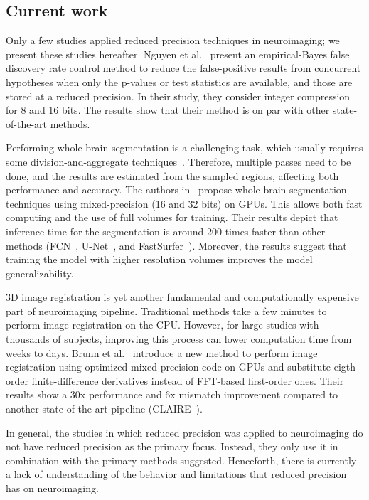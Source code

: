 \subsection{Current work}
Only a few studies applied reduced precision techniques in neuroimaging; we present these studies hereafter.
Nguyen et al.~\cite{Nguyen2018-lo} present an empirical-Bayes false discovery rate
control method to reduce the false-positive results from concurrent hypotheses when
only the p-values or test statistics are available, and those are stored at a reduced precision. 
In their study, they consider integer compression for 8 and 16 bits.
The results show that their method is on par with other state-of-the-art methods.
		
Performing whole-brain segmentation is a challenging task, which usually requires
some division-and-aggregate techniques~\cite{Li2021-rv}.
Therefore, multiple passes need to be done, and the results are estimated from the sampled regions, affecting both performance and accuracy.
The authors in~\cite{Li2021-rv} propose whole-brain segmentation techniques using mixed-precision (16 and 32 bits) on GPUs.
This allows both fast computing and the use of full volumes for training. 
Their results depict that inference time for the segmentation is around 200 times
faster than other methods (FCN~\cite{Long2015-qr}, U-Net~\cite{Ronneberger2015-wy}, and FastSurfer~\cite{Henschel2020-vq}).
Moreover, the results suggest that training the model with higher resolution volumes improves the model generalizability.
		
3D image registration is yet another fundamental and computationally expensive part
of neuroimaging pipeline.
Traditional methods take a few minutes to perform image registration on the CPU.
However, for large studies with thousands of subjects, improving this process can lower computation time from weeks to days.
Brunn et al.~\cite{Brunn2021-zj} introduce a new method to perform image registration
using optimized mixed-precision code on GPUs and substitute eigth-order
finite-difference derivatives instead of FFT-based first-order ones.
Their results show a 30x performance and 6x mismatch improvement compared to
another state-of-the-art pipeline (CLAIRE~\cite{Mang2019-nu}).
		
In general, the studies in which reduced precision was applied to neuroimaging do not have reduced precision as the primary focus.
Instead, they only use it in combination with the primary methods suggested.
Henceforth, there is currently a lack of understanding of the behavior and limitations that reduced precision has on neuroimaging.
	
